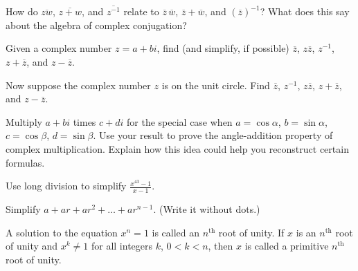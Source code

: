 \documentclass[space,nooutcomes]{ximera}
\begin{document}
\begin{problem}
How do $\overline{zw}$, $\overline{z+w}$, and $\overline{z^{-1}}$ relate to $\overline{z}\,\overline{w}$, $\overline{z}+\overline{w}$, and $(\overline{z})^{-1}$?  What does this say about the algebra of complex conjugation?  
\vfill 
\end{problem}

\begin{problem}
Given a complex number $z=a+bi$, find (and simplify, if possible) $\overline{z}$, $z\overline{z}$, $z^{-1}$, $z+\overline{z}$, and $z-\overline{z}$.  
\vfill 
\end{problem}

\begin{problem}
Now suppose the complex number $z$ is on the unit circle.  Find $\overline{z}$, $z^{-1}$, $z\overline{z}$, $z+\overline{z}$, and $z-\overline{z}$.
\vfill 
\end{problem}


\newpage 


\begin{problem}
Multiply $a + bi$ times $c + di$ for the special case when $a=\cos\alpha$, $b=\sin\alpha$, 
$c=\cos\beta$, $d=\sin\beta$.  Use your result to prove the angle-addition property of complex multiplication.  Explain how this idea could help you reconstruct certain formulas.  
\vfill 
\end{problem}


\begin{problem}
Use long division to simplify $\frac{x^{43}-1}{x-1}$.
\vfill 
\end{problem}

\begin{problem}
Simplify $a+ar+ar^2+\dots+ar^{n-1}$.  (Write it without dots.)
\vfill 
\end{problem}

\newpage 


A solution to the equation $x^n=1$ is called an $n^\text{th}$  root of unity.  If $x$ is an $n^\text{th}$ root of unity and $x^k\ne 1$ for all integers $k$, $0<k<n$, then $x$ is called a primitive $n^\text{th}$ root of unity.  
\end{document}
